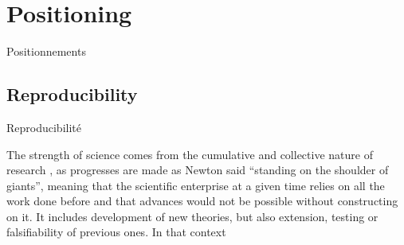 



\chapter{Positioning}{Positionnements} %

\label{ch:positioning} %


\headercit{}{}{}

\bigskip









\newpage



\section{Reproducibility}{Reproducibilité}









The strength of science comes from the cumulative and collective nature of research 
, as progresses are made as Newton said ``standing on the shoulder of giants'', meaning that the scientific enterprise at a given time relies on all the work done before and that advances would not be possible without constructing on it. It includes development of new theories, but also extension, testing or falsifiability of previous ones. In that context 




